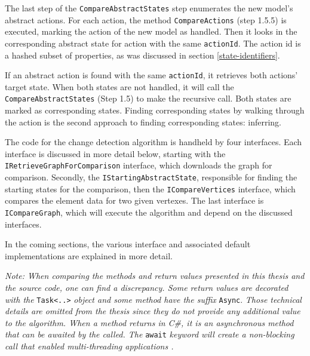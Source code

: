 The last step of the \verb|CompareAbstractStates| step enumerates the new model's abstract actions. For each action, the method \verb|CompareActions| (step 1.5.5) is executed, marking the action of the new model as handled. Then it looks in the corresponding abstract state for action with the same \verb|actionId|. The action id is a hashed subset of properties, as was discussed in section \ref{state-identifiers}. 

If an abstract action is found with the same \verb|actionId|, it retrieves both actions' target state. When both states are not handled, it will call the \verb|CompareAbstractStates| (Step 1.5) to make the recursive call. Both states are marked as corresponding states. Finding corresponding states by walking through the action is the second approach to finding corresponding states: inferring.

The code for the change detection algorithm is handheld by four interfaces. Each interface is discussed in more detail below, starting with the \verb|IRetrieveGraphForComparison| interface, which downloads the graph for comparison. Secondly, the \verb|IStartingAbstractState|, responsible for finding the starting states for the comparison, then the \verb|ICompareVertices| interface, which compares the element data for two given vertexes. The last interface is \verb|ICompareGraph|, which will execute the algorithm and depend on the discussed interfaces. 

In the coming sections, the various interface and associated default implementations are explained in more detail.

\textit{Note: When comparing the methods and return values presented in this thesis and the source code, one can find a discrepancy. Some return values are decorated with the} \verb|Task<..>| \textit{object and some method have the suffix} \verb|Async|. \textit{Those technical details are omitted from the thesis since they do not provide any additional value to the algorithm. When a method returns in C\#, it is an asynchronous method that can be awaited by the called. The} \verb|await| \textit{keyword will create a non-blocking call that enabled multi-threading applications \cite{asynchronous-programming}.}

\newpage

